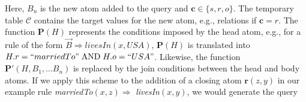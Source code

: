\noindent Here, $B_n$ is the new atom added to the query and $\bm{c} \in \{s, r, o\}$. 
The temporary table $\mathcal{C}$ contains the target values for the new atom, e.g., relations
if $\bm{c} = r$. The function $\bm{P}(H)$ represents the conditions imposed by the head atom, e.g., for a rule
of the form $\vec{B} \Rightarrow livesIn(x, USA)$, $\bm{P}(H)$ is translated into 
$H.r = ``marriedTo"\; \text{AND}\; H.o = ``USA"$. Likewise, the function $\bm{P'}(H, B_1, \dots B_n)$
is replaced by the join conditions between the head and body atoms. 
If we apply this scheme to the addition of a closing atom $\bm{r}(z,y)$ in our example rule
\emph{marriedTo}$(x,z) \Rightarrow $ \emph{livesIn}$(x,y)$, we would generate the query
\\\\
